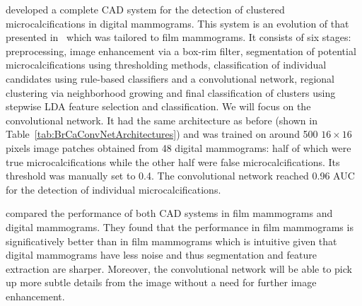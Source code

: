 \begin{comment}
- Like Gurcan2002 but slightly changed for digital mammography
- six stages
- trained on manually sleected miucrocalcifications and some selected by the CAD which were not  microcalcifications
- threshold chosen by training as 0.4 to remove signals with low CNN scores
\end{comment}
\cite{Ge2006} developed a complete CAD system for the detection of clustered microcalcifications in digital mammograms. This system is an evolution of that presented in~\cite{Gurcan2002} which was tailored to film mammograms. It consists of six stages: preprocessing, image enhancement via a box-rim filter, segmentation of potential microcalcifications using thresholding methods, classification of individual candidates using rule-based classifiers and a convolutional network, regional clustering via neighborhood growing and final classification of clusters using stepwise LDA feature selection and classification. We will focus on the convolutional network. It had the same architecture as before (shown in Table~\ref{tab:BrCaConvNetArchitectures}) and was trained on around 500 $16 \times 16$ pixels image patches obtained from 48 digital mammograms: half of which were true microcalcifications while the other half were false microcalcifications. Its threshold was manually set to 0.4. The convolutional network reached 0.96 AUC for the detection of individual microcalcifications. 

\cite{Ge2007} compared the performance of both CAD systems in film mammograms and digital mammograms. They found that the performance in film mammograms is significatively better than in film mammograms which is intuitive given that digital mammograms have less noise and thus segmentation and feature extraction are sharper. Moreover, the convolutional network will be able to pick up more subtle details from the image without a need for further image enhancement.





